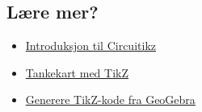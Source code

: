 \documentclass[12pt, a4paper]{article}
\begin{document}
\subsection*{Lære mer?}
\begin{itemize}
	\item
	\href{https://www.sharelatex.com/blog/2013/09/02/tikz-series-pt4.html}{Introduksjon til Circuitikz}

	\item
	\href{https://www.sharelatex.com/blog/2013/09/04/tikz-series-pt5.html}{Tankekart med TikZ}

	\item
	\href{https://www.sharelatex.com/blog/2013/08/28/tikz-series-pt2.html}{Generere TikZ-kode fra GeoGebra}
\end{itemize}
\end{document}
